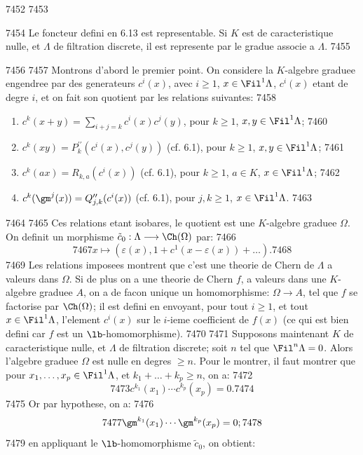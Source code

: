   7452	
  7453	\begin{prop}
  7454	Le foncteur defini en 6.13 est representable. Si $K$ est de caracteristique nulle, et $\Lambda$ de filtration discrete, il est represente par le gradue associe a $\Lambda$.
  7455	\end{prop}
  7456	
  7457	Montrons d'abord le premier point. On considere la $K$-algebre graduee engendree par des generateurs $c^i(x)$, avec $i \geqslant 1$, $x \in \Fil^1 \Lambda$, $c^i(x)$ etant de degre $i$, et on fait son quotient par les relations suivantes:
  7458	\begin{enumerate}[label=\roman*)]
  7459	\item $c^k(x+y) = \sum\limits_{i+j=k} c^i(x) c^j(y)$, pour $k \geqslant 1$, $x, y \in \Fil^1 \Lambda$;
  7460	\item $c^k(xy) = P^{\prime\prime}_k(c^i(x), c^j(y))$ (cf. 6.1), pour $k \geqslant 1$, $x, y \in \Fil^1 \Lambda$;
  7461	\item $c^k(ax) = R_{k,a}(c^i(x))$ (cf. 6.1), pour $k \geqslant 1$, $a \in K$, $x \in \Fil^1 \Lambda$;
  7462	\item $c^k(\gm^j(x)) = Q^{\prime\prime}_{j,k}(c^i(x))$ (cf. 6.1), pour $j, k \geqslant 1$, $x \in \Fil^1 \Lambda$.
  7463	\end{enumerate}
  7464	
  7465	Ces relations etant isobares, le quotient est une $K$-algebre graduee $\Omega$. On definit un morphisme $\tilde{c}_0 : \Lambda \longrightarrow \Ch(\Omega)$ par:
  7466	\[
  7467	x \longmapsto (\varepsilon(x), 1+c^1(x-\varepsilon(x))+\ldots).
  7468	\]
  7469	Les relations imposees montrent que c'est une theorie de Chern de $\Lambda$ a valeurs dans $\Omega$. Si de plus on a une theorie de Chern $f$, a valeurs dans une $K$-algebre graduee $A$, on a de facon unique un homomorphisme: $\Omega \longrightarrow A$, tel que $f$ se factorise par $\Ch(\Omega)$; il est defini en envoyant, pour tout $i \geqslant 1$, et tout $x \in \Fil^1 \Lambda$, l'element $c^i(x)$ sur le $i$-ieme coefficient de $f(x)$ (ce qui est bien defini car $f$ est un $\lb$-homomorphisme).
  7470	
  7471	Supposons maintenant $K$ de caracteristique nulle, et $\Lambda$ de filtration discrete; soit $n$ tel que $\Fil^n \Lambda = 0$. Alors l'algebre graduee $\Omega$ est nulle en degres $\geqslant n$. Pour le montrer, il faut montrer que pour $x_1, \ldots, x_p \in \Fil^1 \Lambda$, et $k_1+\ldots+k_p \geqslant n$, on a:
  7472	\[
  7473	c^{k_1}(x_1) \cdots c^{k_p}(x_p) = 0.
  7474	\]
  7475	Or par hypothese, on a:
  7476	\[
  7477	\gm^{k_1}(x_1) \cdots \gm^{k_p}(x_p) = 0;
  7478	\]
  7479	en appliquant le $\lb$-homomorphisme $\tilde{c}_0$, on obtient:
